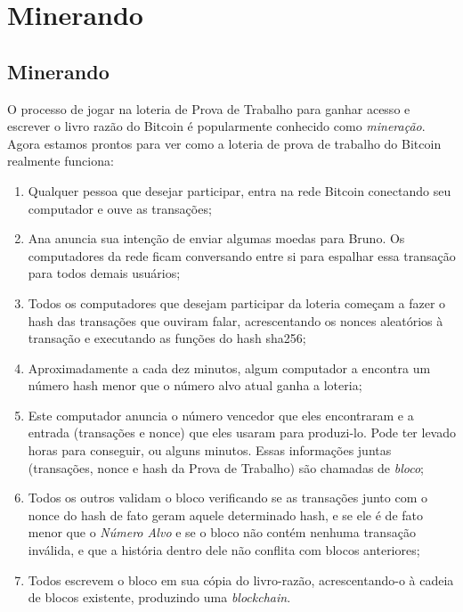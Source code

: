 \part{Minerando}
\label{ch:capitulo5}
\chapter*{Minerando}
O processo de jogar na loteria de Prova de Trabalho para ganhar acesso e escrever o livro razão do Bitcoin é popularmente conhecido como \textit{mineração}.
Agora estamos prontos para ver como a loteria de prova de trabalho do Bitcoin realmente funciona:

\begin{enumerate}
\item Qualquer pessoa que desejar participar, entra na rede Bitcoin conectando seu computador e ouve as transações;
\item Ana anuncia sua intenção de enviar algumas moedas para Bruno. Os computadores da rede ficam conversando entre si para espalhar essa transação para todos demais usuários;
\item Todos os computadores que desejam participar da loteria começam a fazer o hash das transações que ouviram falar, acrescentando os nonces aleatórios à transação e executando as funções do hash sha256;
\item Aproximadamente a cada dez minutos, algum computador a encontra um número hash menor que o número alvo atual ganha a loteria;
\item Este computador anuncia o número vencedor que eles encontraram e a entrada (transações e nonce) que eles usaram para produzi-lo. Pode ter levado horas para conseguir, ou alguns minutos. Essas informações juntas (transações, nonce e hash da Prova de Trabalho) são chamadas de \textit{bloco};
\item Todos os outros validam o bloco verificando se as transações junto com o nonce do hash de fato geram aquele determinado hash, e se ele é de fato menor que o \textit{Número Alvo} e se o bloco não contém nenhuma transação inválida, e que a história dentro dele não conflita com blocos anteriores;
\item Todos escrevem o bloco em sua cópia do livro-razão, acrescentando-o à cadeia de blocos existente, produzindo uma \textit{blockchain}.
\end{enumerate}

